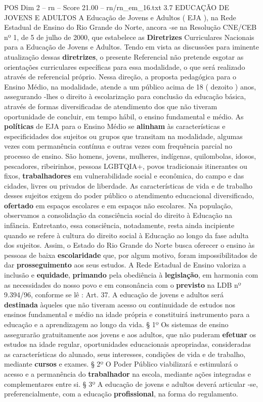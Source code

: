 \begin{textsample}{POS Dim 2 – rn – Score 21.00 – rn/rn\_em\_16.txt}  \label{ex:f2_pos_246}
3.7 EDUCAÇÃO DE JOVENS E ADULTOS A Educação de Jovens e Adultos ( EJA ), na Rede Estadual de Ensino do Rio Grande do Norte, ancora -se na Resolução CNE/CEB nº 1, de 5 de julho de 2000, que estabelece as \textbf{Diretrizes} Curriculares Nacionais para a Educação de Jovens e Adultos.
Tendo em vista as discussões para iminente atualização dessas \textbf{diretrizes}, o presente Referencial não pretende esgotar as orientações curriculares específicas para essa modalidade, o que será realizado através de referencial próprio.
Nessa direção, a proposta pedagógica para o Ensino Médio, na modalidade, atende a um público acima de 18 ( dezoito ) anos, assegurando -lhes o direito à escolarização para conclusão da educação básica, através de formas diversificadas de atendimento dos que não tiveram oportunidade de concluir, em tempo hábil, o ensino fundamental e médio.
As \textbf{políticas} de EJA para o Ensino Médio se \textbf{alinham} às características e especificidades dos sujeitos ou grupos que transitam na modalidade, algumas vezes com permanência contínua e outras vezes com frequência parcial no processo de ensino.
São homens, jovens, mulheres, indígenas, quilombolas, idosos, pescadores, ribeirinhos, pessoas LGBTQIA+, povos tradicionais itinerantes ou fixos, \textbf{trabalhadores} em vulnerabilidade social e econômica, do campo e das cidades, livres ou privados de liberdade.
As características de vida e de trabalho desses sujeitos exigem do poder público o atendimento educacional diversificado, \textbf{ofertado} em espaços escolares e em espaços não escolares.
Na população, observamos a consolidação da consciência social do direito à Educação na infância.
Entretanto, essa consciência, notadamente, resta ainda incipiente quando se refere à cultura do direito social à Educação ao longo da fase adulta dos sujeitos.
Assim, o Estado do Rio Grande do Norte busca oferecer o ensino às pessoas de baixa \textbf{escolaridade} que, por algum motivo, foram impossibilitados de dar \textbf{prosseguimento} aos seus estudos.
A Rede Estadual de Ensino valoriza a inclusão e \textbf{equidade}, \textbf{primando} pela obediência à \textbf{legislação}, em harmonia com as necessidades do nosso povo e em consonância com o \textbf{previsto} na LDB nº 9.394/96, conforme se lê : Art. 37.
A educação de jovens e adultos será \textbf{destinada} àqueles que não tiveram acesso ou continuidade de estudos nos ensinos fundamental e médio na idade própria e constituirá instrumento para a educação e a aprendizagem ao longo da vida. § 1º Os sistemas de ensino assegurarão gratuitamente aos jovens e aos adultos, que não puderam \textbf{efetuar} os estudos na idade regular, oportunidades educacionais apropriadas, consideradas as características do alunado, seus interesses, condições de vida e de trabalho, mediante \textbf{cursos} e exames. § 2º O Poder Público viabilizará e estimulará o acesso e a permanência do \textbf{trabalhador} na escola, mediante ações integradas e complementares entre si. § 3º A educação de jovens e adultos deverá articular -se, preferencialmente, com a educação \textbf{profissional}, na forma do regulamento.

\end{textsample}
